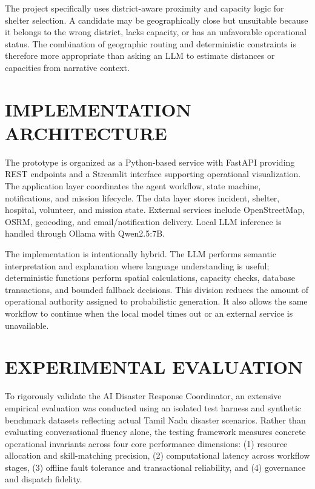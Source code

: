 \documentclass[conference]{IEEEtran}
\begin{document}
The project specifically uses district-aware proximity and capacity logic for shelter selection. A candidate may be geographically close but unsuitable because it belongs to the wrong district, lacks capacity, or has an unfavorable operational status. The combination of geographic routing and deterministic constraints is therefore more appropriate than asking an LLM to estimate distances or capacities from narrative context.

\section{IMPLEMENTATION ARCHITECTURE}
The prototype is organized as a Python-based service with FastAPI providing REST endpoints and a Streamlit interface supporting operational visualization. The application layer coordinates the agent workflow, state machine, notifications, and mission lifecycle. The data layer stores incident, shelter, hospital, volunteer, and mission state. External services include OpenStreetMap, OSRM, geocoding, and email/notification delivery. Local LLM inference is handled through Ollama with Qwen2.5:7B.

The implementation is intentionally hybrid. The LLM performs semantic interpretation and explanation where language understanding is useful; deterministic functions perform spatial calculations, capacity checks, database transactions, and bounded fallback decisions. This division reduces the amount of operational authority assigned to probabilistic generation. It also allows the same workflow to continue when the local model times out or an external service is unavailable.

\section{EXPERIMENTAL EVALUATION}
To rigorously validate the AI Disaster Response Coordinator, an extensive empirical evaluation was conducted using an isolated test harness and synthetic benchmark datasets reflecting actual Tamil Nadu disaster scenarios. Rather than evaluating conversational fluency alone, the testing framework measures concrete operational invariants across four core performance dimensions: (1) resource allocation and skill-matching precision, (2) computational latency across workflow stages, (3) offline fault tolerance and transactional reliability, and (4) governance and dispatch fidelity.
\end{document}

